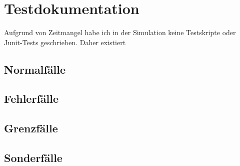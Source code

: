 \chapter{Testdokumentation}\label{ch:testdokumentation}
Aufgrund von Zeitmangel habe ich in der Simulation keine Testskripte oder Junit-Tests geschrieben.
Daher existiert

\section{Normalfälle}\label{sec:normalfaelle}
\section{Fehlerfälle}\label{sec:fehlerfaelle}
\section{Grenzfälle}\label{sec:grenzfaelle}
\section{Sonderfälle}\label{sec:sonderfaelle}
